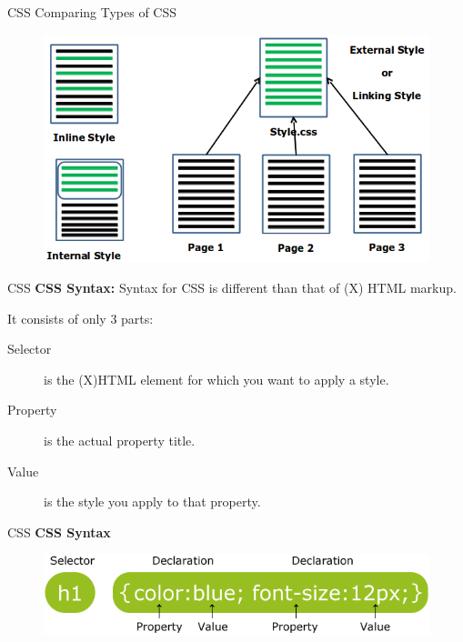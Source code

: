\documentclass[14pt]{beamer}
\begin{document}
\begin{frame}{CSS}
Comparing Types of CSS

\begin{figure}[H]
\begin{center}
\includegraphics[scale=.4]{compare-styles-css.png}
\end{center}
\end{figure}
\end{frame}

\begin{frame}{CSS}
\textbf{CSS Syntax:} Syntax for CSS is different than that of (X) HTML markup.

\vspace{1pc}
It consists of only 3 parts:
\begin{description}
 \item [Selector] is the (X)HTML element for which you want to apply a style.
 \item [Property] is the actual property title.
 \item [Value] is the style you apply to that property.
\end{description}
\end{frame}

\begin{frame}{CSS}
\textbf{CSS Syntax}

\begin{figure}[H]
\centering
\includegraphics[scale=.4]{css-syntax.png}
\end{figure}
\end{frame}
\end{document}
